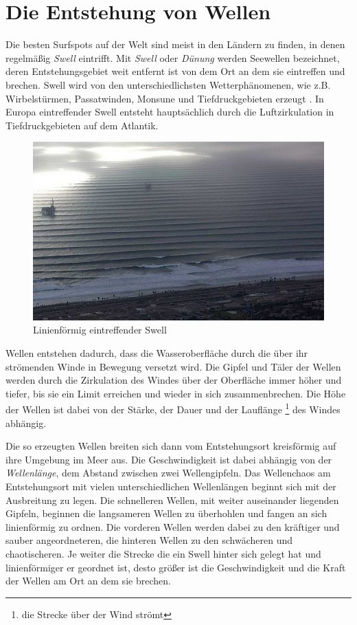 \section{Die Entstehung von Wellen}
Die besten Surfspots auf der Welt sind meist in den Ländern zu finden,
in denen regelmäßig \textit{Swell} eintrifft. Mit \textit{Swell} oder
\textit{Dünung} werden Seewellen bezeichnet, deren Entstehungs\-gebiet
weit entfernt ist von dem Ort an dem sie eintreffen und brechen. Swell
wird von den unterschiedlichsten Wetter\-phänomenen, wie
z.B. Wirbelstürmen, Passatwinden, Monsune und Tiefdruckgebieten
erzeugt \cite[S.15]{storm_europe_1998}. In Europa eintreffender Swell
entsteht hauptsächlich durch die Luftzirkulation in Tiefdruckgebieten
auf dem Atlantik.

\begin{figure}[h]
  \begin{center}
    \includegraphics{bilder/swell}
    \caption{Linienförmig eintreffender Swell}
  \end{center}
\end{figure}

Wellen entstehen dadurch, dass die Wasseroberfläche durch die über ihr
strömenden Winde in Bewegung versetzt wird. Die Gipfel und Täler der
Wellen werden durch die Zirkulation des Windes über der Oberfläche
immer höher und tiefer, bis sie ein Limit erreichen und wieder in sich
zusammenbrechen. Die Höhe der Wellen ist dabei von der Stärke, der
Dauer und der Lauflänge \footnote{die Strecke über der Wind strömt}
des Windes abhängig.

Die so erzeugten Wellen breiten sich dann vom Entstehungsort
kreisförmig auf ihre Umgebung im Meer aus. Die Geschwindigkeit ist
dabei abhängig von der \textit{Wellenlänge}, dem Abstand zwischen zwei
Wellengipfeln. Das Wellenchaos am Entstehungsort mit vielen
unterschiedlichen Wellenlängen beginnt sich mit der Ausbreitung zu
legen. Die schnelleren Wellen, mit weiter auseinander liegenden
Gipfeln, beginnen die langsameren Wellen zu überhohlen und fangen an
sich linienförmig zu ordnen. Die vorderen Wellen werden dabei zu den
kräftiger und sauber angeordneteren, die hinteren Wellen zu den
schwächeren und chaotischeren. Je weiter die Strecke die ein Swell
hinter sich gelegt hat und linienförmiger er geordnet ist, desto
größer ist die Geschwindigkeit und die Kraft der Wellen am Ort an dem
sie brechen.

